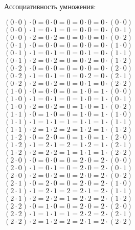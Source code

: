 \documentclass{article}
\begin{document}
	\newpage
	Ассоциативность умножения: \\
	\begin{center}
		$(0 \cdot 0) \cdot 0 = 0 \cdot 0 = 0 = 0 \cdot 0 = 0 \cdot (0 \cdot 0)$ \\
		$(0 \cdot 0) \cdot 1 = 0 \cdot 1 = 0 = 0 \cdot 0 = 0 \cdot (0 \cdot 1)$ \\
		$(0 \cdot 0) \cdot 2 = 0 \cdot 2 = 0 = 0 \cdot 0 = 0 \cdot (0 \cdot 2)$ \\
		$(0 \cdot 1) \cdot 0 = 0 \cdot 0 = 0 = 0 \cdot 0 = 0 \cdot (1 \cdot 0)$ \\
		$(0 \cdot 1) \cdot 1 = 0 \cdot 1 = 0 = 0 \cdot 1 = 0 \cdot (1 \cdot 1)$ \\
		$(0 \cdot 1) \cdot 2 = 0 \cdot 2 = 0 = 0 \cdot 2 = 0 \cdot (1 \cdot 2)$ \\
		$(0 \cdot 2) \cdot 0 = 0 \cdot 0 = 0 = 0 \cdot 0 = 0 \cdot (2 \cdot 0)$ \\
		$(0 \cdot 2) \cdot 1 = 0 \cdot 1 = 0 = 0 \cdot 2 = 0 \cdot (2 \cdot 1)$ \\
		$(0 \cdot 2) \cdot 2 = 0 \cdot 2 = 0 = 0 \cdot 1 = 0 \cdot (2 \cdot 2)$ \\
		$(1 \cdot 0) \cdot 0 = 0 \cdot 0 = 0 = 1 \cdot 0 = 1 \cdot (0 \cdot 0)$ \\
		$(1 \cdot 0) \cdot 1 = 0 \cdot 1 = 0 = 1 \cdot 0 = 1 \cdot (0 \cdot 1)$ \\
		$(1 \cdot 0) \cdot 2 = 0 \cdot 2 = 0 = 1 \cdot 0 = 1 \cdot (0 \cdot 2)$ \\
		$(1 \cdot 1) \cdot 0 = 1 \cdot 0 = 0 = 1 \cdot 0 = 1 \cdot (1 \cdot 0)$ \\
		$(1 \cdot 1) \cdot 1 = 1 \cdot 1 = 1 = 1 \cdot 1 = 1 \cdot (1 \cdot 1)$ \\
		$(1 \cdot 1) \cdot 2 = 1 \cdot 2 = 2 = 1 \cdot 2 = 1 \cdot (1 \cdot 2)$ \\
		$(1 \cdot 2) \cdot 0 = 2 \cdot 0 = 0 = 1 \cdot 0 = 1 \cdot (2 \cdot 0)$ \\
		$(1 \cdot 2) \cdot 1 = 2 \cdot 1 = 2 = 1 \cdot 2 = 1 \cdot (2 \cdot 1)$ \\
		$(1 \cdot 2) \cdot 2 = 2 \cdot 2 = 1 = 1 \cdot 1 = 1 \cdot (2 \cdot 2)$ \\
		$(2 \cdot 0) \cdot 0 = 0 \cdot 0 = 0 = 2 \cdot 0 = 2 \cdot (0 \cdot 0)$ \\
		$(2 \cdot 0) \cdot 1 = 0 \cdot 1 = 0 = 2 \cdot 0 = 2 \cdot (0 \cdot 1)$ \\
		$(2 \cdot 0) \cdot 2 = 0 \cdot 2 = 0 = 2 \cdot 0 = 2 \cdot (0 \cdot 2)$ \\
		$(2 \cdot 1) \cdot 0 = 2 \cdot 0 = 0 = 2 \cdot 0 = 2 \cdot (1 \cdot 0)$ \\
		$(2 \cdot 1) \cdot 1 = 2 \cdot 1 = 2 = 2 \cdot 1 = 2 \cdot (1 \cdot 1)$ \\
		$(2 \cdot 1) \cdot 2 = 2 \cdot 2 = 1 = 2 \cdot 2 = 2 \cdot (1 \cdot 2)$ \\
		$(2 \cdot 2) \cdot 0 = 1 \cdot 0 = 0 = 2 \cdot 0 = 2 \cdot (2 \cdot 0)$ \\
		$(2 \cdot 2) \cdot 1 = 1 \cdot 1 = 1 = 2 \cdot 2 = 2 \cdot (2 \cdot 1)$ \\
		$(2 \cdot 2) \cdot 2 = 1 \cdot 2 = 2 = 2 \cdot 1 = 2 \cdot (2 \cdot 2)$ \\
	\end{center}
\end{document}
